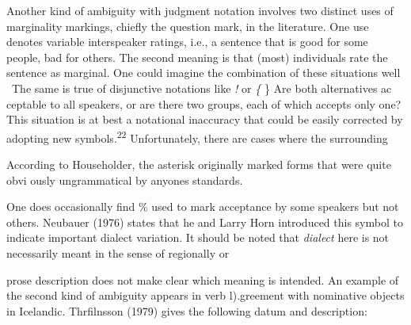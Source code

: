 \begin{styleTextbody}
Another kind of ambiguity with judgment notation involves two distinct uses of marginality markings, chiefly the question mark, in the literature. One use denotes variable interspeaker ratings, i.e., a sentence that is good for some people, bad for others. The second meaning is that (most) individuals rate the sentence as marginal. One could imagine the combination of these situations well \ The same is true of disjunctive notations like \textit{{\textquotedbl}!{\textquotedbl}}\textit{ }or {\textquotedbl}\textit{\{}\textit{ }\}{\textquotedbl} Are both alternatives ac\- ceptable to all speakers, or are there two groups, each of which accepts only one? This situation is at best a notational inaccuracy that could be easily corrected by adopting new symbols.\textsuperscript{22}\textsuperscript{ }Unfortunately, there are cases where the surrounding
\end{styleTextbody}


\setcounter{listWWNumlxleveli}{14}
\begin{listWWNumlxleveli}
\item 
\begin{styleStandard}
According to Householder, the asterisk originally marked forms that were {\textquotedbl}quite obvi\- ously ungrammatical by anyone{\textquotesingle}s standards.{\textquotedbl}
\end{styleStandard}


\item 
\begin{styleStandard}
One does occasionally find {\textquotedbl}\%{\textquotedbl} used to mark acceptance by some speakers but not others. Neubauer (1976) states that he and Larry Horn introduced this symbol to indicate important dialect variation. It should be noted that \textit{dialect}\textit{ }here is not necessarily meant in the sense of regionally or
\end{styleStandard}


\end{listWWNumlxleveli}
\clearpage\setcounter{page}{1}\begin{styleStandard}
prose description does not make clear which meaning is intended. An example of the second kind of ambiguity appears in verb l).greement with nominative objects in Icelandic. Thrfilnsson (1979) gives the following datum and description:
\end{styleStandard}


